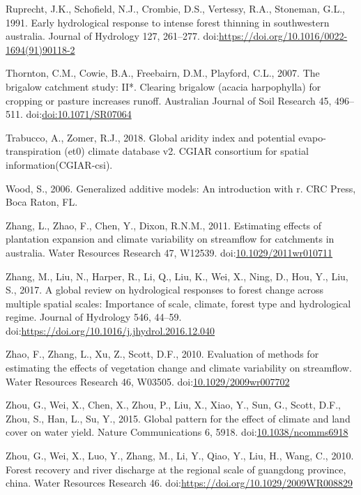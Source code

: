 \documentclass[]{elsarticle} %
\begin{document}
\leavevmode\hypertarget{ref-ruprechtetal1991}{}%
Ruprecht, J.K., Schofield, N.J., Crombie, D.S., Vertessy, R.A.,
Stoneman, G.L., 1991. Early hydrological response to intense forest
thinning in southwestern australia. Journal of Hydrology 127, 261--277.
doi:\href{https://doi.org/https://doi.org/10.1016/0022-1694(91)90118-2}{https://doi.org/10.1016/0022-1694(91)90118-2}

\leavevmode\hypertarget{ref-thornton2007}{}%
Thornton, C.M., Cowie, B.A., Freebairn, D.M., Playford, C.L., 2007. The
brigalow catchment study: II*. Clearing brigalow (acacia harpophylla)
for cropping or pasture increases runoff. Australian Journal of Soil
Research 45, 496--511.
doi:\href{https://doi.org/doi:10.1071/SR07064}{doi:10.1071/SR07064}

\leavevmode\hypertarget{ref-trabucco2018}{}%
Trabucco, A., Zomer, R.J., 2018. Global aridity index and potential
evapo-transpiration (et0) climate database v2. CGIAR consortium for
spatial information(CGIAR-csi).

\leavevmode\hypertarget{ref-wood2006}{}%
Wood, S., 2006. Generalized additive models: An introduction with r. CRC
Press, Boca Raton, FL.

\leavevmode\hypertarget{ref-zhang2011}{}%
Zhang, L., Zhao, F., Chen, Y., Dixon, R.N.M., 2011. Estimating effects
of plantation expansion and climate variability on streamflow for
catchments in australia. Water Resources Research 47, W12539.
doi:\href{https://doi.org/10.1029/2011wr010711}{10.1029/2011wr010711}

\leavevmode\hypertarget{ref-zhang2017}{}%
Zhang, M., Liu, N., Harper, R., Li, Q., Liu, K., Wei, X., Ning, D., Hou,
Y., Liu, S., 2017. A global review on hydrological responses to forest
change across multiple spatial scales: Importance of scale, climate,
forest type and hydrological regime. Journal of Hydrology 546, 44--59.
doi:\href{https://doi.org/https://doi.org/10.1016/j.jhydrol.2016.12.040}{https://doi.org/10.1016/j.jhydrol.2016.12.040}

\leavevmode\hypertarget{ref-zhao2010}{}%
Zhao, F., Zhang, L., Xu, Z., Scott, D.F., 2010. Evaluation of methods
for estimating the effects of vegetation change and climate variability
on streamflow. Water Resources Research 46, W03505.
doi:\href{https://doi.org/10.1029/2009wr007702}{10.1029/2009wr007702}

\leavevmode\hypertarget{ref-zhou2015}{}%
Zhou, G., Wei, X., Chen, X., Zhou, P., Liu, X., Xiao, Y., Sun, G.,
Scott, D.F., Zhou, S., Han, L., Su, Y., 2015. Global pattern for the
effect of climate and land cover on water yield. Nature Communications
6, 5918.
doi:\href{https://doi.org/10.1038/ncomms6918}{10.1038/ncomms6918}

\leavevmode\hypertarget{ref-zhou2010}{}%
Zhou, G., Wei, X., Luo, Y., Zhang, M., Li, Y., Qiao, Y., Liu, H., Wang,
C., 2010. Forest recovery and river discharge at the regional scale of
guangdong province, china. Water Resources Research 46.
doi:\href{https://doi.org/https://doi.org/10.1029/2009WR008829}{https://doi.org/10.1029/2009WR008829}
\end{document}
